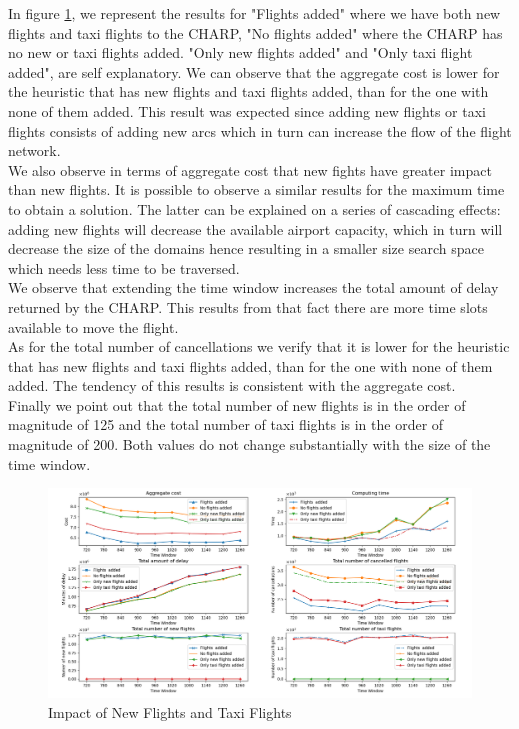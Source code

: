 In  figure \ref{fig:flightNoFlight}, we represent the results for "Flights added" where we have both new flights and taxi flights to the CHARP, "No flights added" where the CHARP has no new or taxi flights added. "Only new flights added" and "Only taxi flight added", are self explanatory. We can observe that the aggregate cost is lower for the heuristic that has new flights and taxi flights added, than for the one with none of them added. This result was expected since adding new flights or taxi flights consists of adding new arcs which in turn can increase the flow of the flight network.\\
 We also observe in terms of aggregate cost that new fights have greater impact than new flights. It is possible to observe a similar results for the maximum time to obtain a solution. The latter can be explained on a series of cascading effects: adding new flights will decrease the available airport capacity, which in turn will decrease the size of the domains hence resulting in a smaller size search space which needs less time to be traversed.\\

 We  observe that extending the time window increases the total amount of delay returned by the CHARP. This results from that fact there are more time slots available to move the flight.\\
 
  As for the total number of cancellations we verify that it is lower for the heuristic that has new flights and taxi flights added, than for the one with none of them added. The tendency of this results is consistent with the aggregate cost. \\
  
   Finally we point out that the total number of new flights is in the order of magnitude of 125 and the total number of taxi flights is in the order of magnitude of 200. Both values do not change substantially with the size of the time window.

	\begin{figure}[h!]
		\centering
		\includegraphics[width=\textwidth]{figures/flightNoFlight2x3.png}
		\caption[]{Impact of New Flights and Taxi Flights}
		\label{fig:flightNoFlight}
	\end{figure}


